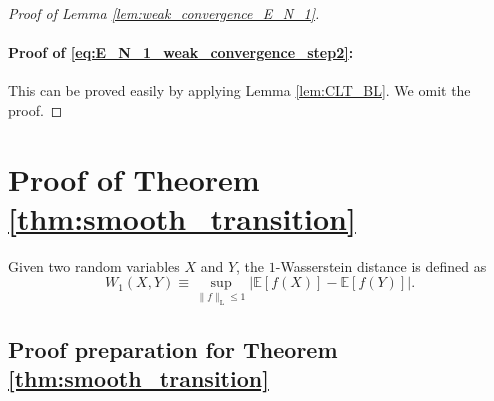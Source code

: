 \documentclass[12pt]{article}
\newcommand{\E}{\mathbb E}								%
\begin{document}
\begin{proof}[Proof of Lemma \ref{lem:weak_convergence_E_N_1}]
	\paragraph{Proof of \eqref{eq:E_N_1_weak_convergence_step2}:}

	This can be proved easily by applying Lemma \ref{lem:CLT_BL}. We omit the proof. 

\end{proof}




\section{Proof of Theorem \ref{thm:smooth_transition}}\label{sec:proof_smooth_transition}

Given two random variables \(X\) and \(Y\), the \(1\)-Wasserstein distance is defined as 
\[
W_1(X, Y) \equiv \sup_{\|f\|_{\mathrm{L}} \leq 1} \big|\E[f(X)] - \E[f(Y)]\big|.
\]

\subsection{Proof preparation for Theorem \ref{thm:smooth_transition}}
\end{document}
